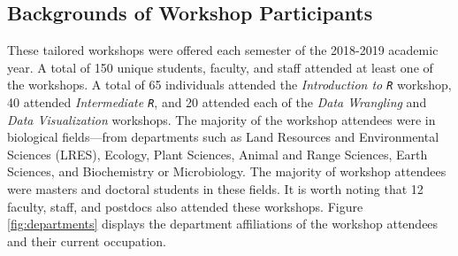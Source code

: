 \documentclass[12pt]{article}
\begin{document}
% 
% 


\subsection{Backgrounds of Workshop Participants}

\quad These tailored workshops were offered each semester of the 2018-2019
academic year. A total of 150 unique students, faculty, and staff attended at
least one of the workshops. A total of 65 individuals attended the 
\emph{Introduction to \texttt{R}} workshop, 40 attended \emph{Intermediate 
\texttt{R}}, and 20 attended each of the \emph{Data Wrangling} and \emph{Data
Visualization} workshops. The majority of the workshop attendees were in 
biological fields---from departments such as Land Resources and Environmental
Sciences (LRES), Ecology, Plant Sciences, Animal and Range Sciences, Earth
Sciences, and Biochemistry or Microbiology. The majority of workshop attendees
were masters and doctoral students in these fields. It is worth noting that 12
faculty, staff, and postdocs also attended these workshops. Figure 
\ref{fig:departments} displays the department affiliations of the workshop
attendees and their current occupation. 
\end{document}
